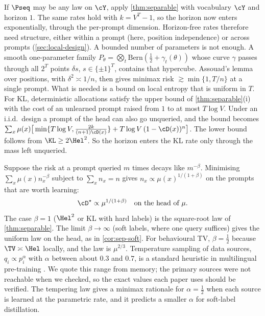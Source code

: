 \begin{remark}\label{rem:sep-general}
If $\Pseq$ may be any law on $\cY$, apply \cref{thm:separable} with vocabulary $\cY$ and horizon $1$. The same
rates hold with $k=V^T-1$, so the horizon now enters exponentially, through the per-prompt dimension.
Horizon-free rates therefore need structure, either within a prompt (here, position independence)
or across prompts (\cref{sec:local-design}). A bounded number of parameters is not enough. A smooth
one-parameter family $P_\theta=\bigotimes_t\mathrm{Bern}(\frac12+\gamma_t(\theta))$ whose curve $\gamma$ passes through all
$2^T$ points $\delta s$, $s\in\{\pm1\}^T$, contains that hypercube. Assouad's lemma over positions, with
$\delta^2\asymp1/n$, then gives minimax risk $\gtrsim\min\{1,T/n\}$ at a single prompt. What is needed is a
bound on local entropy that is uniform in $T$. For KL, deterministic allocations satisfy the upper
bound of \cref{thm:separable}(i) with the cost of an unlearned prompt raised from $1$ to at most $T\log V$.
Under an i.i.d.\ design a prompt of the head can also go unqueried, and the bound becomes
$\sum_x\mu(x)\big[\min\{T\log V,\frac{2k}{(n+1)\cD(x)}\}+T\log V\,(1-\cD(x))^n\big]$. The lower bound follows from
$\KL\ge2\Hel^2$. So the horizon enters the KL rate only through the mass left unqueried.
\end{remark}

\begin{heuristic}\label{heur:tempering}
Suppose the risk at a prompt queried $m$ times decays like $m^{-\beta}$. Minimising
$\sum_x\mu(x)n_x^{-\beta}$ subject to $\sum_xn_x=n$ gives $n_x\propto\mu(x)^{1/(1+\beta)}$ on the prompts that are worth
learning:
\[
\cD^\star\propto\mu^{1/(1+\beta)}\quad\text{on the head of }\mu .
\]
The case $\beta=1$ ($\Hel^2$ or KL with hard labels) is the square-root law of \cref{thm:separable}. The limit
$\beta\to\infty$ (soft labels, where one query suffices) gives the uniform law on the head, as in
\cref{cor:sep-soft}. For behavioural TV, $\beta=\frac12$ because $\TV\asymp\Hel$ locally, and the law is $\mu^{2/3}$.
Temperature sampling of data sources, $q_i\propto p_i^\alpha$ with $\alpha$ between about $0.3$ and $0.7$, is a
standard heuristic in multilingual pre-training \citep{lample2019cross,xue2021mt5}. We quote this range from
memory; the primary sources were not reachable when we checked, so the exact values each paper uses
should be verified. The tempering law gives a minimax rationale for $\alpha=\frac12$ when each source is learned
at the parametric rate, and it predicts a smaller $\alpha$ for soft-label distillation.
\end{heuristic}


